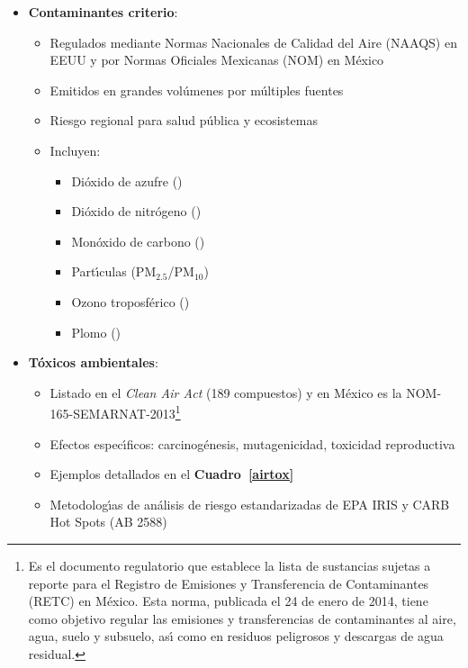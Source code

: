 \begin{itemize}
    \item \textbf{Contaminantes criterio}: 
    \begin{itemize}
        \item Regulados mediante Normas Nacionales de Calidad del Aire (NAAQS) en EEUU y por Normas Oficiales Mexicanas (NOM) en M\'exico
        \item Emitidos en grandes vol\'umenes por m\'ultiples fuentes
        \item Riesgo regional para salud p\'ublica y ecosistemas
        \item Incluyen: 
        \begin{itemize}
            \item Di\'oxido de azufre ()
            \item Di\'oxido de nitr\'ogeno ()
            \item Mon\'oxido de carbono ()
            \item Part\'{\i}culas (PM$_{2.5}$/PM$_{10}$)
            \item Ozono troposf\'erico ()
            \item Plomo ()
        \end{itemize}
    \end{itemize}
    
    \item \textbf{T\'oxicos ambientales}:
    \begin{itemize}
        \item Listado en el \emph{Clean Air Act} (189 compuestos) y en M\'exico es la  \gls{NOM}-165-\gls{SEMARNAT}-2013\footnote{Es el documento regulatorio que establece la lista de sustancias sujetas a reporte para el Registro de Emisiones y Transferencia de Contaminantes (RETC) en M\'exico. Esta norma, publicada el 24 de enero de 2014, tiene como objetivo regular las emisiones y transferencias de contaminantes al aire, agua, suelo y subsuelo, as\'{\i} como en residuos peligrosos y descargas de agua residual.}
        \item Efectos espec\'{\i}ficos: carcinog\'enesis, mutagenicidad, toxicidad reproductiva
        \item Ejemplos detallados en el \textbf{Cuadro~\ref{airtox}}
        \item Metodolog\'{\i}as de an\'alisis de riesgo estandarizadas de \gls{EPA} IRIS y  \gls{CARB} Hot Spots (AB 2588)
    \end{itemize}
\end{itemize}

